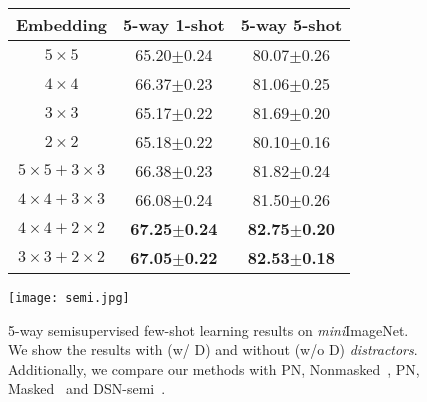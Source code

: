 \documentclass{SCIS2019}
\makeatletter
\newcommand\figcaption{\def\@captype{figure}\caption}
\newcommand\tabcaption{\def\@captype{table}\caption}
\makeatother
\begin{document}
	\begin{figure}
		\begin{minipage}{0.5\linewidth}
			\tabcaption{5-way, 1-shot and 5-shot recognition accuracy (\%) with different numbers of image patches on \emph{mini}ImageNet.}
			\begin{tabular}[t]{ccc}
				\toprule
				\label{number}
				Embedding     
				&5-way 1-shot & 5-way 5-shot\\
				\midrule	
				$5\times5$ &65.20$\pm$\footnotesize{0.24} &80.07$\pm$\footnotesize{0.26} \\
				$4\times4$ &66.37$\pm$\footnotesize{0.23} &81.06$\pm$\footnotesize{0.25} \\
				$3\times3$ &65.17$\pm$\footnotesize{0.22} &81.69$\pm$\footnotesize{0.20} \\
				$2\times2$ &65.18$\pm$\footnotesize{0.22} &80.10$\pm$\footnotesize{0.16} \\
				$5\times5+3\times3$ &66.38$\pm$\footnotesize{0.23} &81.82$\pm$\footnotesize{0.24} \\	
				$4\times4+3\times3$ &66.08$\pm$\footnotesize{0.24} &81.50$\pm$\footnotesize{0.26} \\
				$4\times4+2\times2$ &\textbf{67.25$\pm$\footnotesize{0.24}} &\textbf{82.75$\pm$\footnotesize{0.20}} \\	
				$3\times3+2\times2$ &\textbf{67.05$\pm$\footnotesize{0.22}} & \textbf{82.53$\pm$\footnotesize{0.18}} \\
				\bottomrule
			\end{tabular}
			
		\end{minipage}
		\begin{minipage}{0.45\linewidth}
			\centering
			\texttt{[image: semi.jpg]} \figcaption{
				5-way semisupervised few-shot learning results on \emph{mini}ImageNet. We show the results with (w/ D) and without (w/o D) \emph{distractors}. Additionally, we compare our methods with PN, Nonmasked~\cite{32}, PN, Masked~\cite{32} and DSN-semi~\cite{25}.}
			\label{fig3}
		\end{minipage}
	\end{figure}
	
\end{document}
